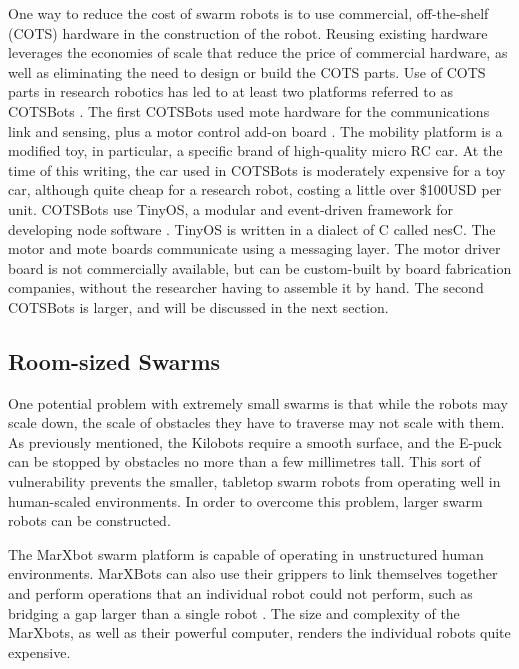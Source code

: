 One way to reduce the cost of swarm robots is to use commercial, off-the-shelf (COTS) hardware in the construction of the robot. 
Reusing existing hardware leverages the economies of scale that reduce the price of commercial hardware, as well as eliminating the need to design or build the COTS parts. 
Use of COTS parts in research robotics has led to at least two platforms referred to as COTSBots \citep{bergbreiter2003cotsbots, soule2011cotsbots}.
The first COTSBots used mote hardware for the communications link and sensing, plus a motor control add-on board \citep{bergbreiter2003cotsbots}. 
The mobility platform is a modified toy, in particular, a specific brand of high-quality micro RC car.
At the time of this writing, the car used in COTSBots is moderately expensive for a toy car, although quite cheap for a research robot, costing a little over \$100USD per unit. 
COTSBots use TinyOS, a modular and event-driven framework for developing node software \citep{levis2005tinyos}. 
TinyOS is written in a dialect of C called nesC. 
The motor and mote boards communicate using a messaging layer. 
The motor driver board is not commercially available, but can be custom-built by board fabrication companies, without the researcher having to assemble it by hand. 
The second COTSBots is larger, and will be discussed in the next section. 

\subsection{Room-sized Swarms}

One potential problem with extremely small swarms is that while the robots may scale down, the scale of obstacles they have to traverse may not scale with them. 
As previously mentioned, the Kilobots require a smooth surface, and the E-puck can be stopped by obstacles no more than a few millimetres tall. 
This sort of vulnerability prevents the smaller, tabletop swarm robots from operating well in human-scaled environments. 
In order to overcome this problem, larger swarm robots can be constructed.
 
The MarXbot swarm platform is capable of operating in unstructured human environments. 
MarXBots can also use their grippers to link themselves together and perform operations that an individual robot could not perform, such as bridging a gap larger than a single robot \citep{bonani2010marxbot}. 
The size and complexity of the MarXbots, as well as their powerful computer, renders the individual robots quite expensive. 

